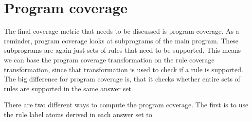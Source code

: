 \section{Program coverage}
\label{sec:Computing coverage metrics for propositional programs/Program coverage}
The final coverage metric that needs to be discussed is program coverage. As a reminder, program coverage looks at subprograms of the main program. These subprograms are again just sets of rules that need to be supported. This means we can base the program coverage transformation on the rule coverage transformation, since that transformation is used to check if a rule is supported. The big difference for program coverage is, that it checks whether entire sets of rules are supported in the same answer set. 

There are two different ways to compute the program coverage. The first is to use the rule label atoms derived in each answer set to 

